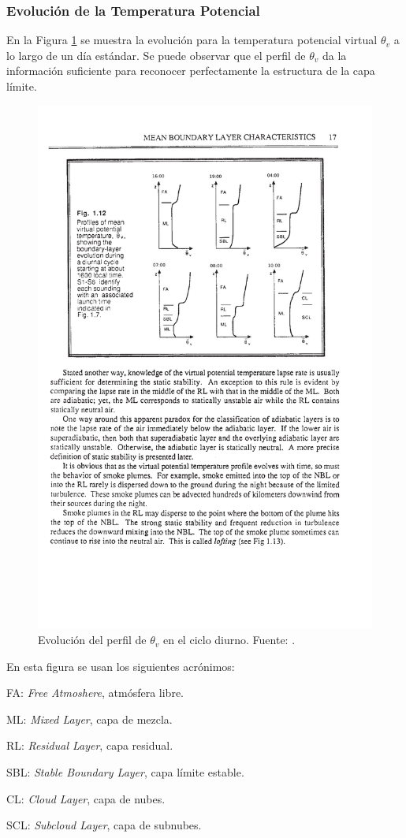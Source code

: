 \subsubsection{Evolución de la Temperatura Potencial}
En la Figura \ref{fig:03_pbl2} se muestra la evolución para la temperatura potencial virtual $\theta_v$ a lo largo de un día estándar. Se puede observar que el perfil de $\theta_v$ da la información suficiente para reconocer perfectamente la estructura de la capa límite. 
\begin{figure}[h!]
	\centering
	\includegraphics[width=0.7\linewidth,trim={5.6cm 14cm 2.7cm 3.3cm},clip]{Imagenes/03/pbl2}
	\caption{Evolución del perfil de $\theta_v$ en el ciclo diurno. Fuente: \cite{stull1988introduction}.}
	\label{fig:03_pbl2}
\end{figure}

En esta figura se usan los siguientes acrónimos:
\begin{itemize*}
	\item FA: \emph{Free Atmoshere}, atmósfera libre.
	\item ML: \emph{Mixed Layer}, capa de mezcla.
	\item RL: \emph{Residual Layer}, capa residual.
	\item SBL: \emph{Stable Boundary Layer}, capa límite estable.
	\item CL: \emph{Cloud Layer}, capa de nubes.
	\item SCL: \emph{Subcloud Layer}, capa de subnubes.
\end{itemize*}
